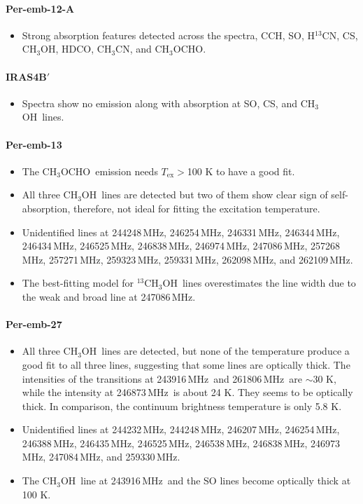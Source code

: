 \documentclass[twocolumn]{aastex62}
\newcommand{\mhz}{\mbox{\,MHz}}
\newcommand{\htcn}{\mbox{H$^{13}$CN}}
\newcommand{\methylformate}{\mbox{CH$_{3}$OCHO}}
\newcommand{\methanol}{\mbox{CH$_{3}$OH}}
\newcommand{\tmethanol}{\mbox{$^{13}$CH$_{3}$OH}}
\newcommand{\acetaldehyde}{\mbox{CH$_{3}$CHO}}
\newcommand{\methylcyanide}{\mbox{CH$_{3}$CN}}
\begin{document}
\paragraph{Per-emb-12-A}
\begin{itemize}
  \item Strong absorption features detected across the spectra, CCH, SO, \htcn, CS, \methanol, HDCO, \methylcyanide, and \methylformate.
\end{itemize}

\paragraph{IRAS4B$\prime$}
\begin{itemize}
  \item Spectra show no emission along with absorption at SO, CS, and \methanol\ lines.
\end{itemize}

\paragraph{Per-emb-13}
\begin{itemize}
  \item The \methylformate\ emission needs $T_\text{ex} > $100 K to have a good fit.
  \item All three \methanol\ lines are detected but two of them show clear sign of self-absorption, therefore, not ideal for fitting the excitation temperature.
  \item Unidentified lines at 244248\mhz, 246254\mhz, 246331\mhz, 246344\mhz, 246434\mhz, 246525\mhz, 246838\mhz, 246974\mhz, 247086\mhz, 257268\mhz, 257271\mhz, 259323\mhz, 259331\mhz, 262098\mhz, and 262109\mhz.
  \item The best-fitting model for \tmethanol\ lines overestimates the line width due to the weak and broad line at 247086\mhz.
\end{itemize}

\paragraph{Per-emb-27}
\begin{itemize}
  \item All three \methanol\ lines are detected, but none of the temperature produce a good fit to all three lines, suggesting that some lines are optically thick.  The intensities of the transitions at 243916\mhz\ and 261806\mhz\ are $\sim$30 K, while the intensity at 246873\mhz\ is about 24 K.  They seems to be optically thick.  In comparison, the continuum brightness temperature is only 5.8 K.
  \item Unidentified lines at 244232\mhz, 244248\mhz, 246207\mhz, 246254\mhz, 246388\mhz, 246435\mhz, 246525\mhz, 246538\mhz, 246838\mhz, 246973\mhz, 247084\mhz, and 259330\mhz.
  \item The \methanol\ line at 243916\mhz\ and the SO lines become optically thick at 100 K.
\end{itemize}
\end{document}
